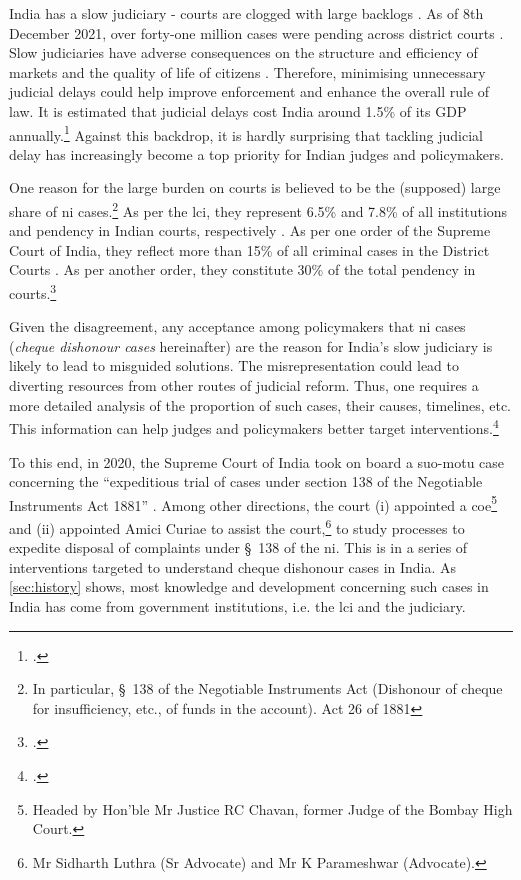 India has a slow judiciary - courts are clogged with large backlogs \autocite{moog1992delays, debroy2008justice, dutta2019modernise}. As of 8th December 2021, over forty-one million cases were pending across district courts \autocite{njdg2021}. Slow judiciaries have adverse consequences on the structure and efficiency of markets and the quality of life of citizens \autocite{world2004world, chemin2007impact, rao2020institutional}. Therefore, minimising unnecessary judicial delays could help improve enforcement and enhance the overall rule of law. It is estimated that judicial delays cost India around 1.5\% of its GDP annually.\footcite{dey2016_cost} Against this backdrop, it is hardly surprising that tackling judicial delay has increasingly become a top priority for Indian judges and policymakers.

One reason for the large burden on courts is believed to be the (supposed) large share of \gls{ni} cases.\footnote{In particular, \S~138 of the Negotiable Instruments Act (Dishonour of cheque for insufficiency, etc., of funds in the account). Act 26 of 1881} As per the \gls{lci}, they represent 6.5\% and 7.8\% of all institutions and pendency in Indian courts, respectively \autocite{lci2014_arrears}. As per one order of the Supreme Court of India, they reflect more than 15\% of all criminal cases in the District Courts \autocite{sc2020_makwanavstate}. As per another order, they constitute 30\% of the total pendency in courts.\footcite[Similarly, a study published by the Department of Justice briefly touches on the burden of such cases on the judiciary and posits that they constitute 34\% of pending criminal cases in Maharashtra.][]{sc2020_138, mahadik2018_maharashtra}

Given the disagreement, any acceptance among policymakers that \gls{ni} cases (\textit{cheque dishonour cases} hereinafter) are the reason for India's slow judiciary is likely to lead to misguided solutions. The misrepresentation could lead to diverting resources from other routes of judicial reform. Thus, one requires a more detailed analysis of the proportion of such cases, their causes, timelines, etc. This information can help judges and policymakers better target interventions.\footcite[For the importance of accurate judicial data, see][]{damle2020_ecourtsData, daksh2020_data, damle2020_land}

To this end, in 2020, the Supreme Court of India took on board a suo-motu case concerning the “expeditious trial of cases under section 138 of the Negotiable Instruments Act 1881” \autocite{sc2020_138}. Among other directions, the court (i) appointed a \gls{coe}\footnote{Headed by Hon’ble Mr Justice RC Chavan, former Judge of the Bombay High Court.} and (ii) appointed Amici Curiae to assist the court,\footnote{Mr Sidharth Luthra (Sr Advocate) and Mr K Parameshwar (Advocate).} to study processes to expedite disposal of complaints under \S~138 of the \gls{ni}. This is in a series of interventions targeted to understand cheque dishonour cases in India. As \cref{sec:history} shows, most knowledge and development concerning such cases in India has come from government institutions, i.e. the \gls{lci} and the judiciary.

